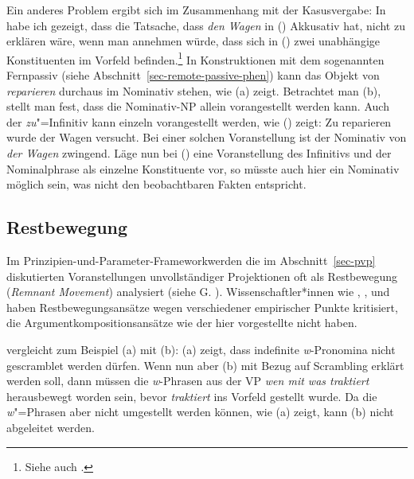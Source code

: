 Ein anderes Problem ergibt sich im Zusammenhang mit der Kasusvergabe:
In  habe ich gezeigt, dass die Tatsache,
dass \emph{den Wagen} in () Akkusativ hat, nicht zu erklären wäre, wenn man annehmen würde,
dass sich in () zwei unabhängige Konstituenten im Vorfeld befinden.\footnote{
  Siehe auch .%
}
\eal 
{}
\zl
In Konstruktionen mit dem sogenannten Fernpassiv (siehe Abschnitt~\ref{sec-remote-passive-phen})
kann das Objekt von \emph{reparieren} durchaus im Nominativ stehen, wie (a) zeigt.
Betrachtet man (b), stellt man fest, dass die Nominativ-NP allein vorangestellt werden kann.
\eal
{}
\zl
Auch der \emph{zu}"=Infinitiv kann einzeln vorangestellt werden, wie () zeigt:
\ea
Zu reparieren wurde der Wagen versucht.
\z
Bei einer solchen Voranstellung ist der Nominativ von \emph{der Wagen} zwingend.
Läge nun bei () eine Voranstellung des Infinitivs und der Nominalphrase 
als einzelne Konstituente vor, so müsste auch hier ein Nominativ möglich sein, 
was nicht den beobachtbaren Fakten entspricht.


\subsection{Restbewegung}
\label{sec-restbewegung}

Im Prinzipien-und-Parameter-Framework\indexgb werden die im Abschnitt~\ref{sec-pvp} diskutierten
Voranstellungen unvollständiger Projektionen
oft als Restbewegung (\emph{Remnant Movement}) analysiert (siehe \zb G. \citealp{GMueller96a,GMueller98a}).
Wissenschaftler*innen wie \citet[]{Haider93a}, \citet[Abschnitt~4.2.5]{deKuthy2002a},
\citet[Abschnitt~2]{dKM2001a} und \citet{Fanselow2002a} haben Restbewegungsansätze wegen
verschiedener empirischer Punkte kritisiert, die Argumentkompositionsansätze wie der hier vorgestellte nicht haben.%

\citet[281]{Haider93a} vergleicht zum Beispiel (a) mit (b):
\eal
{}
\zl
(a) zeigt, dass indefinite \emph{w}-Pronomina nicht gescramblet werden dürfen. Wenn nun aber
(b) mit Bezug auf Scrambling erklärt werden soll, dann müssen die \emph{w}-Phrasen aus der VP
\emph{wen mit was traktiert} herausbewegt worden sein, bevor \emph{traktiert} ins Vorfeld gestellt
wurde. Da die \emph{w}"=Phrasen aber nicht umgestellt werden können, wie (a) zeigt, kann
(b) nicht abgeleitet werden.

